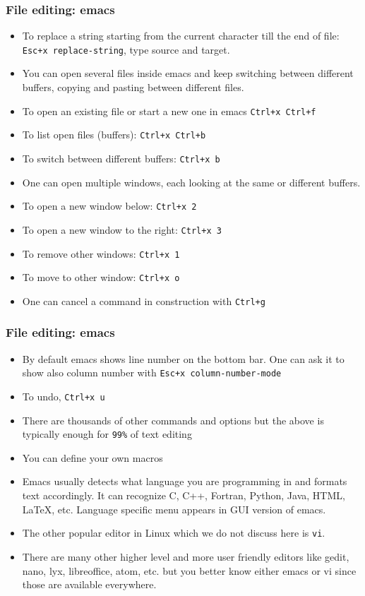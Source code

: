 \documentclass{beamer}
\begin{document}
\begin{frame}[fragile]
  \frametitle{File editing: emacs}
\begin{itemize}
\item To replace a string starting from the current character till the end of file: {\color{mycolorcli}\verb|Esc+x replace-string|}, type source and target.
\item You can open several files inside emacs and keep switching between different buffers, copying and pasting between different files.
\item To open an existing file or start a new one in emacs {\color{mycolorcli}\verb|Ctrl+x Ctrl+f|}
\item To list open files (buffers): {\color{mycolorcli}\verb|Ctrl+x Ctrl+b|}
\item To switch between different buffers: {\color{mycolorcli}\verb|Ctrl+x b|}
\item One can open multiple windows, each looking at the same or different buffers.
\item To open a new window below:  {\color{mycolorcli}\verb|Ctrl+x 2|}
\item To open a new window to the right:  {\color{mycolorcli}\verb|Ctrl+x 3|}
\item To remove other windows: {\color{mycolorcli}\verb|Ctrl+x 1|}
\item To move to other window: {\color{mycolorcli}\verb|Ctrl+x o|}
\item One can cancel a command in construction with  {\color{mycolorcli}\verb|Ctrl+g|}
\end{itemize}
\end{frame}


\begin{frame}[fragile]
  \frametitle{File editing: emacs}
\begin{itemize}
\item By default emacs shows line number on the bottom bar. One can ask it to show also column number with {\color{mycolorcli}\verb|Esc+x column-number-mode|}
\item To undo, {\color{mycolorcli}\verb|Ctrl+x u|}
\item There are thousands of other commands and options but the above is typically enough for \verb|99%| of text editing
\item You can define your own macros
\item Emacs usually detects what language you are programming in and formats text accordingly. It can recognize C, C++, Fortran, Python,
Java, HTML, LaTeX, etc. Language specific menu appears in GUI version of emacs.
\item The other popular editor in Linux which we do not discuss here is {\color{mycolorcli}\verb|vi|}. 
\item There are many other higher level and more user friendly editors like {\color{mycolorcli}gedit}, 
  nano, lyx, libreoffice, atom, etc. 
  but you better know either emacs or vi since those are available everywhere.
\end{itemize}
\end{frame}
\end{document}
